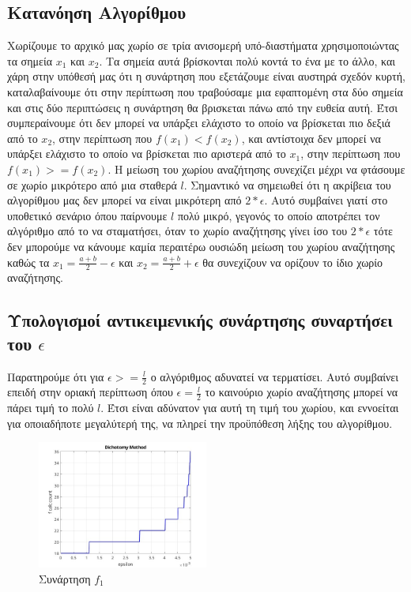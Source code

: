 \subsection{Κατανόηση Αλγορίθμου}

Χωρίζουμε το αρχικό μας χωρίο σε τρία ανισομερή υπό-διαστήματα χρησιμοποιώντας τα σημεία $x_1$ και $x_2$.
Τα σημεία αυτά βρίσκονται πολύ κοντά το ένα με το άλλο, και χάρη στην υπόθεσή μας ότι η συνάρτηση που
εξετάζουμε είναι αυστηρά σχεδόν κυρτή, καταλαβαίνουμε ότι στην περίπτωση που τραβούσαμε μια εφαπτομένη 
στα δύο σημεία και στις δύο περιπτώσεις η συνάρτηση θα βρισκεται πάνω από την ευθεία αυτή. Έτσι 
συμπεραίνουμε ότι δεν μπορεί να υπάρξει ελάχιστο το οποίο να βρίσκεται πιο δεξιά από το $x_2$, στην 
περίπτωση που $f(x_1) < f(x_2)$, και αντίστοιχα δεν μπορεί να υπάρξει ελάχιστο το οποίο να βρίσκεται πιο
αριστερά από το $x_1$, στην περίπτωση που $f(x_1) >= f(x_2)$. Η μείωση του χωρίου αναζήτησης συνεχίζει
μέχρι να φτάσουμε σε χωρίο μικρότερο από μια σταθερά $l$. Σημαντικό να σημειωθεί ότι η ακρίβεια του 
αλγορίθμου μας δεν μπορεί να είναι μικρότερη από $2*\epsilon$. Αυτό συμβαίνει γιατί στο υποθετικό σενάριο
όπου παίρνουμε $l$ πολύ μικρό, γεγονός το οποίο αποτρέπει τον αλγόριθμο από το να σταματήσει, όταν το
χωρίο αναζήτησης γίνει ίσο του $2*\epsilon$ τότε δεν μπορούμε να κάνουμε καμία περαιτέρω ουσιώδη μείωση
του χωρίου αναζήτησης καθώς τα $x_1=\frac{a+b}{2}-\epsilon$ και $x_2=\frac{a+b}{2}+\epsilon$ θα συνεχίζουν 
να ορίζουν το ίδιο χωρίο αναζήτησης.

\subsection{Υπολογισμοί αντικειμενικής συνάρτησης συναρτήσει του $\epsilon$}
Παρατηρούμε ότι για $\epsilon >= \frac{l}{2}$ ο αλγόριθμος αδυνατεί να τερματίσει. Αυτό συμβαίνει
επειδή στην οριακή περίπτωση όπου $\epsilon = \frac{l}{2}$ το καινούριο χωρίο αναζήτησης μπορεί να 
πάρει τιμή το πολύ $l$. Έτσι είναι αδύνατον για αυτή τη τιμή του χωρίου, και εννοείται για οποιαδήποτε 
μεγαλύτερή της, να πληρεί την προϋπόθεση λήξης του αλγορίθμου.

\begin{figure}[H] %
    \centering
    \includegraphics[width=0.5\textwidth]{media/dichotomyf1_1} %
    \caption{Συνάρτηση $f_1$}
\end{figure}

